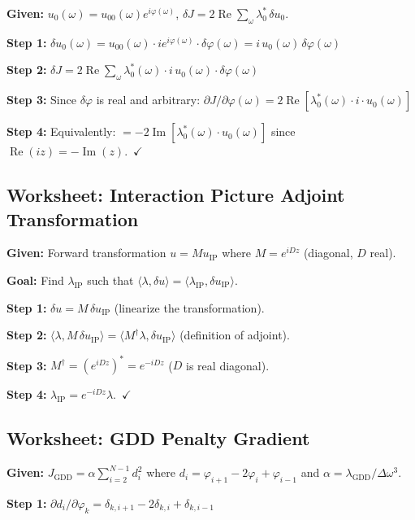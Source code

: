 \documentclass[12pt,a4paper]{article}
\newcommand{\Real}{\operatorname{Re}}
\newcommand{\Imag}{\operatorname{Im}}
\theoremstyle{definition}
\begin{document}
\textbf{Given:} $u_0(\omega) = u_{00}(\omega)e^{i\varphi(\omega)}$, $\delta J = 2\Real\sum_\omega \lambda_0^*\,\delta u_0$.

\textbf{Step 1:} $\delta u_0(\omega) = u_{00}(\omega)\cdot ie^{i\varphi(\omega)}\cdot\delta\varphi(\omega) = i\,u_0(\omega)\,\delta\varphi(\omega)$

\textbf{Step 2:} $\delta J = 2\Real\sum_\omega \lambda_0^*(\omega)\cdot i\,u_0(\omega)\cdot\delta\varphi(\omega)$

\textbf{Step 3:} Since $\delta\varphi$ is real and arbitrary: $\partial J/\partial\varphi(\omega) = 2\Real[\lambda_0^*(\omega)\cdot i\cdot u_0(\omega)]$

\textbf{Step 4:} Equivalently: $= -2\Imag[\lambda_0^*(\omega)\cdot u_0(\omega)]$ since $\Real(iz) = -\Imag(z)$.~$\checkmark$

\subsection{Worksheet: Interaction Picture Adjoint Transformation}

\textbf{Given:} Forward transformation $u = Mu_{\text{IP}}$ where $M = e^{iDz}$ (diagonal, $D$ real).

\textbf{Goal:} Find $\lambda_{\text{IP}}$ such that $\langle\lambda, \delta u\rangle = \langle\lambda_{\text{IP}}, \delta u_{\text{IP}}\rangle$.

\textbf{Step 1:} $\delta u = M\,\delta u_{\text{IP}}$ (linearize the transformation).

\textbf{Step 2:} $\langle\lambda, M\,\delta u_{\text{IP}}\rangle = \langle M^\dagger\lambda, \delta u_{\text{IP}}\rangle$ (definition of adjoint).

\textbf{Step 3:} $M^\dagger = (e^{iDz})^* = e^{-iDz}$ ($D$ is real diagonal).

\textbf{Step 4:} $\lambda_{\text{IP}} = e^{-iDz}\lambda$.~$\checkmark$

\subsection{Worksheet: GDD Penalty Gradient}

\textbf{Given:} $J_{\text{GDD}} = \alpha\sum_{i=2}^{N-1}d_i^2$ where $d_i = \varphi_{i+1}-2\varphi_i+\varphi_{i-1}$ and $\alpha = \lambda_{\text{GDD}}/\Delta\omega^3$.

\textbf{Step 1:} $\partial d_i/\partial\varphi_k = \delta_{k,i+1} - 2\delta_{k,i} + \delta_{k,i-1}$
\end{document}
